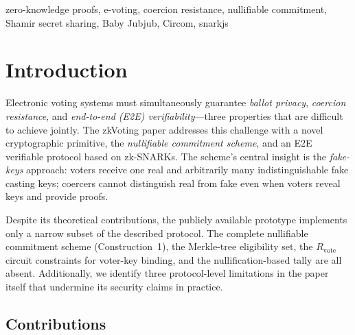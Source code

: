 \documentclass[conference]{IEEEtran}
\begin{document}
\begin{IEEEkeywords}
zero-knowledge proofs, e-voting, coercion resistance, nullifiable commitment,
Shamir secret sharing, Baby Jubjub, Circom, snarkjs
\end{IEEEkeywords}

\section{Introduction}
\label{sec:intro}

Electronic voting systems must simultaneously guarantee \emph{ballot
privacy}, \emph{coercion resistance}, and \emph{end-to-end (E2E)
verifiability}---three properties that are difficult to achieve jointly.
The zkVoting paper \cite{park2024zkvoting} addresses this challenge with a
novel cryptographic primitive, the \emph{nullifiable commitment scheme}, and
an E2E verifiable protocol based on zk-SNARKs.  The scheme's central insight
is the \emph{fake-keys} approach: voters receive one real and arbitrarily
many indistinguishable fake casting keys; coercers cannot distinguish real
from fake even when voters reveal keys and provide proofs.

Despite its theoretical contributions, the publicly available prototype
implements only a narrow subset of the described protocol.  The complete
nullifiable commitment scheme (Construction~1), the Merkle-tree eligibility
set, the $R_{\text{vote}}$ circuit constraints for voter-key binding, and the
nullification-based tally are all absent.  Additionally, we identify three
protocol-level limitations in the paper itself that undermine its security
claims in practice.

\subsection{Contributions}
\end{document}
